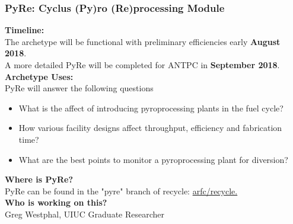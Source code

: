 \documentclass[9pt]{beamer}
\begin{document}
	\begin{frame}
	\frametitle{PyRe: Cyclus (Py)ro (Re)processing Module}
	\textbf{Timeline:} \\
	The archetype will be functional with preliminary efficiencies early \textbf{August 2018}. \\
	A more detailed PyRe will be completed for ANTPC in \textbf{September 2018}. \\
	\vspace{1mm}
	\textbf{Archetype Uses:} \\
	PyRe will answer the following questions
	\begin{itemize}
			\item What is the affect of introducing pyroprocessing plants in the fuel cycle?
			\item How various facility designs affect throughput, efficiency and fabrication time?
			\item What are the best points to monitor a pyroprocessing plant for diversion?
	\end{itemize}
	\vspace{1mm}
	\textbf{Where is PyRe?} \\
	PyRe can be found in the "pyre" branch of recycle: \href{https://github.com/arfc/recycle}{arfc/recycle.} \\
	\vspace{1mm}
	\textbf{Who is working on this?}\\
	Greg Westphal, UIUC Graduate Researcher \\
	
	\end{frame}
\end{document}
